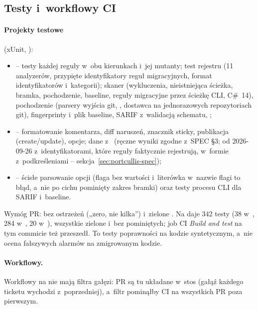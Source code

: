 \subsection{Testy i~workflowy CI}\label{sec:portcullis-ci}

\paragraph{Projekty testowe} (xUnit, ):
\begin{itemize}[leftmargin=*]
  \item {} -- testy każdej reguły w~obu kierunkach i~jej
        mutanty; test rejestru (11 analyzerów, przypięte identyfikatory reguł migracyjnych,
        format identyfikatorów i~kategorii); skaner (wykluczenia,
        nieistniejąca ścieżka, bramka, pochodzenie, baseline, reguły migracyjne przez ścieżkę
        CLI, C\#~14), pochodzenie (parsery wyjścia git, , dostawca na
        jednorazowych repozytoriach git), fingerprinty i~plik baseline, SARIF z~walidacją
        schematu, ;
  \item {} -- formatowanie komentarza, diff naruszeń,
        znacznik sticky, publikacja (create/update), opcje; dane z~
        (ręczne wyniki zgodne z~SPEC §3; od 2026-09-26 z~identyfikatorami, które reguły
        faktycznie rejestrują, w~formie z~podkreśleniami -- sekcja~\ref{sec:portcullis-spec});
  \item {} -- ścisłe parsowanie opcji (flaga bez wartości
        i~literówka w~nazwie flagi to błąd, a~nie po cichu pominięty zakres bramki) oraz
        testy procesu CLI dla SARIF i~baseline.
\end{itemize}
Wymóg PR:  bez ostrzeżeń („zero, nie kilka”) i~zielone
. Na   daje 342 testy
(38 w~, 284 w~, 20
w~), wszystkie zielone i~bez pominiętych; job CI \emph{Build and
test} na tym commicie też przeszedł. To testy poprawności na kodzie syntetycznym, a~nie
ocena fałszywych alarmów na zmigrowanym kodzie.

\paragraph{Workflowy.} Workflowy na  nie mają filtra gałęzi: PR są
tu układane w~stos (gałąź każdego ticketu wychodzi z~poprzedniej), a~filtr 
pominąłby CI na wszystkich PR poza pierwszym.

